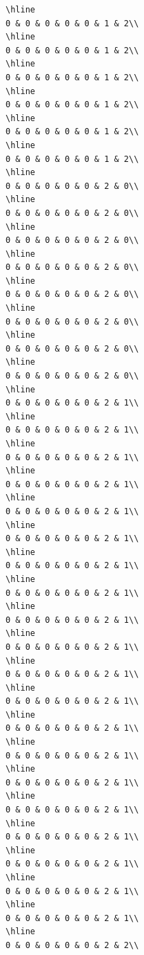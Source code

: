 \documentclass[
]{article}
\begin{document}
\begin{verbatim}
\hline
0 & 0 & 0 & 0 & 0 & 1 & 2\\
\hline
0 & 0 & 0 & 0 & 0 & 1 & 2\\
\hline
0 & 0 & 0 & 0 & 0 & 1 & 2\\
\hline
0 & 0 & 0 & 0 & 0 & 1 & 2\\
\hline
0 & 0 & 0 & 0 & 0 & 1 & 2\\
\hline
0 & 0 & 0 & 0 & 0 & 1 & 2\\
\hline
0 & 0 & 0 & 0 & 0 & 2 & 0\\
\hline
0 & 0 & 0 & 0 & 0 & 2 & 0\\
\hline
0 & 0 & 0 & 0 & 0 & 2 & 0\\
\hline
0 & 0 & 0 & 0 & 0 & 2 & 0\\
\hline
0 & 0 & 0 & 0 & 0 & 2 & 0\\
\hline
0 & 0 & 0 & 0 & 0 & 2 & 0\\
\hline
0 & 0 & 0 & 0 & 0 & 2 & 0\\
\hline
0 & 0 & 0 & 0 & 0 & 2 & 0\\
\hline
0 & 0 & 0 & 0 & 0 & 2 & 1\\
\hline
0 & 0 & 0 & 0 & 0 & 2 & 1\\
\hline
0 & 0 & 0 & 0 & 0 & 2 & 1\\
\hline
0 & 0 & 0 & 0 & 0 & 2 & 1\\
\hline
0 & 0 & 0 & 0 & 0 & 2 & 1\\
\hline
0 & 0 & 0 & 0 & 0 & 2 & 1\\
\hline
0 & 0 & 0 & 0 & 0 & 2 & 1\\
\hline
0 & 0 & 0 & 0 & 0 & 2 & 1\\
\hline
0 & 0 & 0 & 0 & 0 & 2 & 1\\
\hline
0 & 0 & 0 & 0 & 0 & 2 & 1\\
\hline
0 & 0 & 0 & 0 & 0 & 2 & 1\\
\hline
0 & 0 & 0 & 0 & 0 & 2 & 1\\
\hline
0 & 0 & 0 & 0 & 0 & 2 & 1\\
\hline
0 & 0 & 0 & 0 & 0 & 2 & 1\\
\hline
0 & 0 & 0 & 0 & 0 & 2 & 1\\
\hline
0 & 0 & 0 & 0 & 0 & 2 & 1\\
\hline
0 & 0 & 0 & 0 & 0 & 2 & 1\\
\hline
0 & 0 & 0 & 0 & 0 & 2 & 1\\
\hline
0 & 0 & 0 & 0 & 0 & 2 & 1\\
\hline
0 & 0 & 0 & 0 & 0 & 2 & 1\\
\hline
0 & 0 & 0 & 0 & 0 & 2 & 2\\

\end{verbatim}
\end{document}
